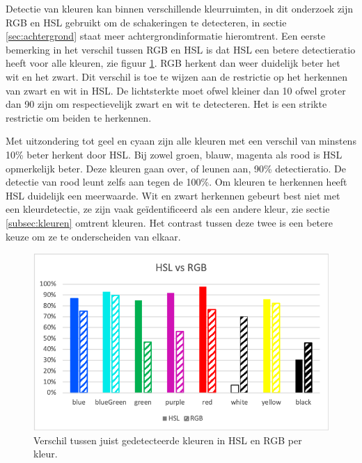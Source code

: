 Detectie van kleuren kan binnen verschillende kleurruimten, in dit onderzoek zijn RGB en HSL gebruikt om de schakeringen te detecteren, in sectie \ref{sec:achtergrond} staat meer achtergrondinformatie hieromtrent. Een eerste bemerking in het verschil tussen RGB en HSL is dat HSL een betere detectieratio heeft voor alle kleuren, zie figuur \ref{fig:HSLvsRGB}. RGB herkent dan weer duidelijk beter het wit en het zwart. Dit verschil is toe te wijzen aan de restrictie op het herkennen van zwart en wit in HSL. De lichtsterkte moet ofwel kleiner dan 10 ofwel groter dan 90 zijn om respectievelijk zwart en wit te detecteren. Het is een strikte restrictie om beiden te herkennen.

Met uitzondering tot geel en cyaan zijn alle kleuren met een verschil van minstens 10\% beter herkent door HSL. Bij zowel groen, blauw, magenta als rood is HSL opmerkelijk beter. Deze kleuren gaan over, of leunen aan, 90\% detectieratio. De detectie van rood leunt zelfs aan tegen de 100\%.
Om kleuren te herkennen heeft HSL duidelijk een meerwaarde. Wit en zwart herkennen gebeurt best niet met een kleurdetectie, ze zijn vaak geïdentificeerd als een andere kleur, zie sectie \ref{subsec:kleuren} omtrent kleuren. Het contrast tussen deze twee is een betere keuze om ze te onderscheiden van elkaar.

\begin{figure}
	\center
	\includegraphics{img/HSLvsRGB}
	\caption{Verschil tussen juist gedetecteerde kleuren in HSL en RGB per kleur.}
	\label{fig:HSLvsRGB}
\end{figure}


